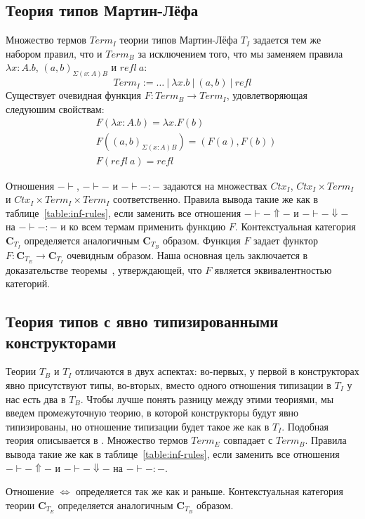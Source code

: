 \documentclass{amsart}
\theoremstyle{definition}
\theoremstyle{remark}
\newcommand{\deq}{\Leftrightarrow}
\newcommand{\cat}[1]{\mathbf{#1}}
\renewcommand{\C}{\cat{C}}
\numberwithin{figure}{section}
\begin{document}
\subsection{Теория типов Мартин-Лёфа}
\label{subsec:MLTT}

Множество термов $Term_I$ теории типов Мартин-Лёфа $T_I$ задается тем же набором правил, что и $Term_B$ за исключением того, что мы заменяем правила $\lambda x : A. b$, $(a, b)_{\Sigma (x : A) B}$ и $refl\ a$:
\[ Term_I := \ldots\ |\ \lambda x. b\ |\ (a, b)\ |\ refl \]
Существует очевидная функция $F : Term_B \to Term_I$, удовлетворяющая следуюшим свойствам:
\begin{align*}
& F(\lambda x : A. b) = \lambda x. F(b) \\
& F((a, b)_{\Sigma (x : A) B}) = (F(a), F(b)) \\
& F(refl\ a) = refl
\end{align*}

Отношения $- \vdash$, $- \vdash -$ и $- \vdash - : -$ задаются на множествах $Ctx_I$, $Ctx_I \times Term_I$ и $Ctx_I \times Term_I \times Term_I$ соответственно.
Правила вывода такие же как в таблице~\ref{table:inf-rules}, если заменить все отношения $- \vdash - \Uparrow -$ и $- \vdash - \Downarrow -$ на $- \vdash - : -$ и ко всем термам применить функцию $F$.
Контекстуальная категория $\C_{T_I}$ определяется аналогичным $\C_{T_B}$ образом.
Функция $F$ задает функтор $F : \C_{T_E} \to \C_{T_I}$ очевидным образом.
Наша основная цель заключается в доказательстве теоремы~, утверждающей, что $F$ является эквивалентностью категорий.

\subsection{Теория типов с явно типизированными конструкторами}

Теории $T_B$ и $T_I$ отличаются в двух аспектах: во-первых, у первой в конструкторах явно присутствуют типы, во-вторых, вместо одного отношения типизации в $T_I$ у нас есть два в $T_B$.
Чтобы лучше понять разницу между этими теориями, мы введем промежуточную теорию, в которой конструкторы будут явно типизированы, но отношение типизации будет такое же как в $T_I$.
Подобная теория описывается в \cite{luo94}.
Множество термов $Term_E$ совпадает с $Term_B$.
Правила вывода такие же как в таблице~\ref{table:inf-rules}, если заменить все отношения $- \vdash - \Uparrow -$ и $- \vdash - \Downarrow -$ на $- \vdash - : -$.

Отношение $\deq$ определяется так же как и раньше.
Контекстуальная категория теории $\C_{T_E}$ определяется аналогичным $\C_{T_B}$ образом.
\end{document}
